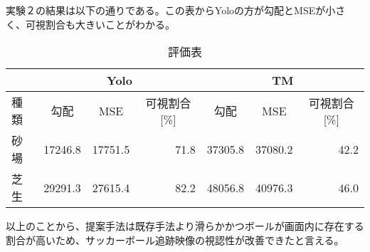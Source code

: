 \documentclass[a4paper,12pt]{article}
\begin{document}
\noindent
実験２の結果は以下の通りである。この表からYoloの方が勾配とMSEが小さく、可視割合も大きいことがわかる。
\begin{table}[htbp]
  \centering
  \label{tab:customTable}
  \caption{評価表}
  \begin{tabular}{|l|r|r|r|r|r|r|}
    \hline
    \multicolumn{1}{|c|}{} & \multicolumn{3}{c|}{Yolo} & \multicolumn{3}{c|}{TM}                                                                                                                            \\ \hline
    種類                     & \multicolumn{1}{|c|}{勾配}  & \multicolumn{1}{|c|}{MSE} & \multicolumn{1}{|c|}{可視割合[\%]} & \multicolumn{1}{|c|}{勾配} & \multicolumn{1}{|c|}{MSE} & \multicolumn{1}{|c|}{可視割合[\%]} \\ \hline
    砂場                     & 17246.8                   & 17751.5                   & 71.8                           & 37305.8                  & 37080.2                   & 42.2                           \\
    芝生                     & 29291.3                   & 27615.4                   & 82.2                           & 48056.8                  & 40976.3                   & 46.0                           \\ \hline
  \end{tabular}
\end{table}

\noindent
以上のことから、提案手法は既存手法より滑らかかつボールが画面内に存在する割合が高いため、サッカーボール追跡映像の視認性が改善できたと言える。
\end{document}
